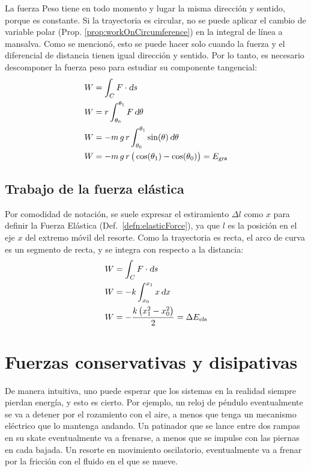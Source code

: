 \documentclass[a5paper,12pt,twoside]{book}
\begin{document}
La fuerza Peso tiene en todo momento y lugar la misma dirección y sentido, porque es constante.
Si la trayectoria es circular, no se puede aplicar el cambio de variable polar (Prop. \ref{prop:workOnCircumference}) en la integral de línea a mansalva.
Como se mencionó, esto se puede hacer solo cuando la fuerza y el diferencial de distancia tienen igual dirección y sentido.
Por lo tanto, es necesario descomponer la fuerza peso para estudiar su componente tangencial:
\begin{align*}
    W &= \int_C F \cdot \textsl{d} s
    \\
    W &= r \int_{\theta_0}^{\theta_1} F \, \textsl{d} \theta
    \\
    W &= - m \, g \, r \int_{\theta_0}^{\theta_1} \sin(\theta)  \, \textsl{d} \theta
    \\
    W &= - m \, g \, r \, \big( \cos(\theta_1) - \cos(\theta_0) \big)
    = {{E}_\textsl{{gra}}}
\end{align*}


\subsection{Trabajo de la fuerza elástica}

Por comodidad de notación, se suele expresar el estiramiento $\Delta l$ como $x$ para definir la Fuerza Elástica (Def.\ \ref{defn:elasticForce}), ya que $l$ es la posición en el eje $x$ del extremo móvil del resorte.
Como la trayectoria es recta, el arco de curva es un segmento de recta, y se integra con respecto a la distancia:
\begin{align*}
    W &= \int_C F \cdot \textsl{d} s
    \\
    W &= - k \int_{x_0}^{x_1} x \, \textsl{d} x
    \\
    W &= - \frac{k \left(x_1^2 - x_0^2\right)}{2} = \Delta {{E}_\textsl{{ela}}}
\end{align*}


\section{Fuerzas conservativas y disipativas}

De manera intuitiva, uno puede esperar que los sistemas en la realidad siempre pierdan energía, y esto es cierto.
Por ejemplo, un reloj de péndulo eventualmente se va a detener por el rozamiento con el aire, a menos que tenga un mecanismo eléctrico que lo mantenga andando.
Un patinador que se lance entre dos rampas en su skate eventualmente va a frenarse, a menos que se impulse con las piernas en cada bajada.
Un resorte en movimiento oscilatorio, eventualmente va a frenar por la fricción con el fluido en el que se mueve.
\end{document}
